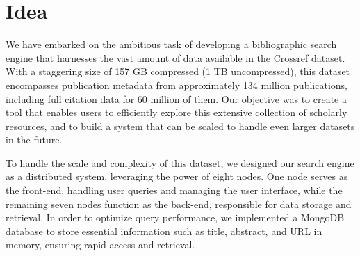 \documentclass{article}
\begin{document}
\section{Idea}

We have embarked on the ambitious task of developing a bibliographic search engine that 
harnesses the vast amount of data available in the Crossref dataset. With a staggering size of 
157 GB compressed (1 TB uncompressed), this dataset encompasses publication metadata from 
approximately 134 million publications, including full citation data for 60 million of them. Our 
objective was to create a tool that enables users to efficiently explore this extensive 
collection of scholarly resources, and to build a system that can be scaled to handle even larger
datasets in the future.

To handle the scale and complexity of this dataset, we designed our search engine as a 
distributed system, leveraging the power of eight nodes. One node serves as the front-end, 
handling user queries and managing the user interface, while the remaining seven nodes function 
as the back-end, responsible for data storage and retrieval. In order to optimize query 
performance, we implemented a MongoDB database to store essential information such as title, 
abstract, and URL in memory, ensuring rapid access and retrieval.
\end{document}
